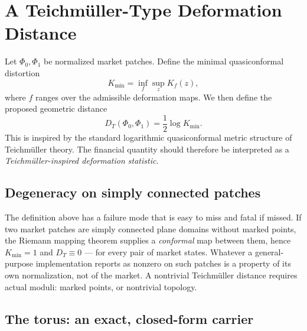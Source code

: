 \documentclass[11pt,a4paper]{article}
\numberwithin{equation}{section}
\begin{document}
\section{A Teichmüller-Type Deformation Distance}

Let $\Phi_0,\Phi_1$ be normalized market patches. Define the minimal
quasiconformal distortion
\begin{equation}
K_{\min}=\inf_f\sup_zK_f(z),
\label{eq:kmin}
\end{equation}
where $f$ ranges over the admissible deformation maps. We then
define the proposed geometric distance
\begin{equation}
D_T(\Phi_0,\Phi_1)=\frac12\log K_{\min}.
\label{eq:teich_distance}
\end{equation}
This is inspired by the standard logarithmic quasiconformal metric
structure of Teichmüller theory. The financial quantity should
therefore be interpreted as a \emph{Teichmüller-inspired deformation
statistic}.

\subsection{Degeneracy on simply connected patches}
\label{sec:degeneracy}

The definition above has a failure mode that is easy to miss and
fatal if missed. If two market patches are simply connected plane
domains without marked points, the Riemann mapping theorem supplies
a \emph{conformal} map between them, hence $K_{\min}=1$ and
$D_T\equiv0$ --- for every pair of market states. Whatever a
general-purpose implementation reports as nonzero on such patches
is a property of its own normalization, not of the market. A
nontrivial Teichmüller distance requires actual moduli: marked
points, or nontrivial topology.

\subsection{The torus: an exact, closed-form carrier}
\label{sec:torus}
\end{document}
